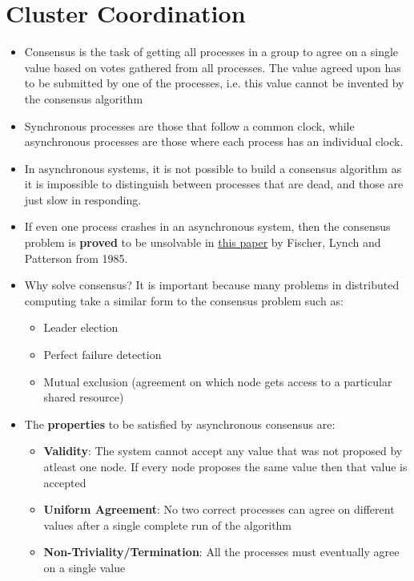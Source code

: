 \documentclass{article}
\begin{document}
\section{Cluster Coordination}
\begin{itemize}
    \item Consensus is the task of getting all processes in a group to agree on a single value based on votes gathered from all processes. The value agreed upon has to be submitted by one of the processes, i.e. this value cannot be invented by the consensus algorithm
    
    \item Synchronous processes are those that follow a common clock, while asynchronous processes are those where each process has an individual clock. 
    
    \item In asynchronous systems, it is not possible to build a consensus algorithm as it is impossible to distinguish between processes that are dead, and those are just slow in responding.
    
    \item If even one process crashes in an asynchronous system, then the consensus problem is \textbf{proved} to be unsolvable in \href{http://groups.csail.mit.edu/tds/papers/Lynch/jacm85.pdf}{this paper} by Fischer, Lynch and Patterson from 1985.
    
    \item Why solve consensus? It is important because many problems in distributed computing take a similar form to the consensus problem such as:
    \begin{itemize}
        \item Leader election
        
        \item Perfect failure detection
        
        \item Mutual exclusion (agreement on which node gets access to a particular shared resource)
    \end{itemize}
    
    \item The \textbf{properties} to be satisfied by asynchronous consensus are:
    \begin{itemize}
        \item \textbf{Validity}: The system cannot accept any value that was not proposed by atleast one node. If every node proposes the same value then that value is accepted
        
        \item \textbf{Uniform Agreement}: No two correct processes can agree on different values after a single complete run of the algorithm
        
        \item \textbf{Non-Triviality/Termination}: All the processes must eventually agree on a single value 
    \end{itemize}
\end{itemize}
\end{document}
